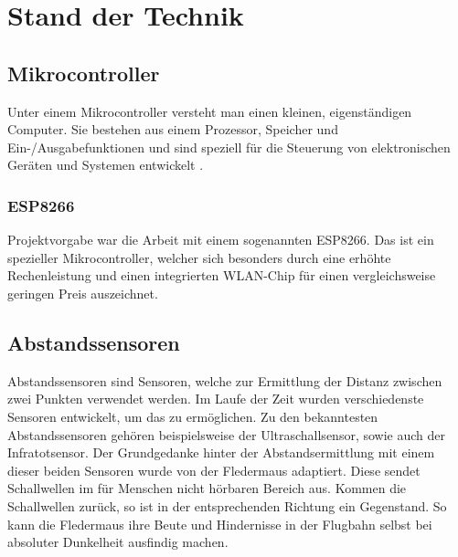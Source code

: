 
\chapter{Stand der Technik}
\section{Mikrocontroller}
Unter einem Mikrocontroller versteht man einen kleinen, eigenständigen Computer. Sie bestehen aus einem Prozessor, Speicher und Ein-/Ausgabefunktionen und sind speziell für die Steuerung von elektronischen Geräten und Systemen entwickelt \protect{}.

\subsection{ESP8266}
Projektvorgabe war die Arbeit mit einem sogenannten ESP8266. Das ist ein spezieller Mikrocontroller, welcher sich besonders durch eine erhöhte Rechenleistung und einen integrierten \ac{WLAN}-Chip für einen vergleichsweise geringen Preis auszeichnet.

\section{Abstandssensoren}
Abstandssensoren sind Sensoren, welche zur Ermittlung der Distanz zwischen zwei Punkten verwendet werden. Im Laufe der Zeit wurden verschiedenste Sensoren entwickelt, um das zu ermöglichen. Zu den bekanntesten Abstandssensoren gehören beispielsweise der Ultraschallsensor, sowie auch der Infratotsensor.
Der Grundgedanke hinter der Abstandsermittlung mit einem dieser beiden Sensoren wurde von der Fledermaus adaptiert. Diese sendet Schallwellen im für Menschen nicht hörbaren Bereich aus. Kommen die Schallwellen zurück, so ist in der entsprechenden Richtung ein Gegenstand. So kann die Fledermaus ihre Beute und Hindernisse in der Flugbahn selbst bei absoluter Dunkelheit ausfindig machen.

